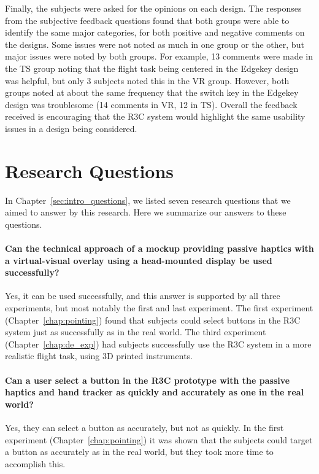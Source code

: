 Finally, the subjects were asked for the opinions on each design.
The responses from the subjective feedback questions found that both groups were able to identify the same major categories, for both positive and negative comments on the designs.
Some issues were not noted as much in one group or the other, but major issues were noted by both groups.
For example, 13 comments were made in the TS group noting that the flight task being centered in the Edgekey design was helpful, but only 3 subjects noted this in the VR group.
However, both groups noted at about the same frequency that the switch key in the Edgekey design was troublesome (14 comments in VR, 12 in TS).
Overall the feedback received is encouraging that the R3C system would highlight the same usability issues in a design being considered.

\section{Research Questions}

In Chapter~\ref{sec:intro_questions}, we listed seven research questions that we aimed to answer by this research.
Here we summarize our answers to these questions.

\paragraph{Can the technical approach of a mockup providing passive haptics with a virtual-visual overlay using a head-mounted display be used successfully?}
Yes, it can be used successfully, and this answer is supported by all three experiments, but most notably the first and last experiment.
The first experiment (Chapter~\ref{chap:pointing}) found that subjects could select buttons in the R3C system just as successfully as in the real world.
The third experiment (Chapter~\ref{chap:de_exp}) had subjects successfully use the R3C system in a more realistic flight task, using 3D printed instruments.

\paragraph{Can a user select a button in the R3C prototype with the passive haptics and hand tracker as quickly and accurately as one in the real world?}
Yes, they can select a button as accurately, but not as quickly.
In the first experiment (Chapter~\ref{chap:pointing}) it was shown that the subjects could target a button as accurately as in the real world, but they took more time to accomplish this.

